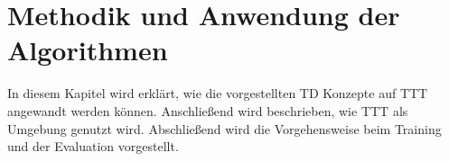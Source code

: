\chapter{Methodik und Anwendung der Algorithmen}
In diesem Kapitel wird erklärt, wie die vorgestellten \ac{TD} Konzepte auf \ac{TTT} angewandt werden können.
Anschließend wird beschrieben, wie \ac{TTT} als Umgebung genutzt wird.
Abschließend wird die Vorgehensweise beim Training und der Evaluation vorgestellt.



